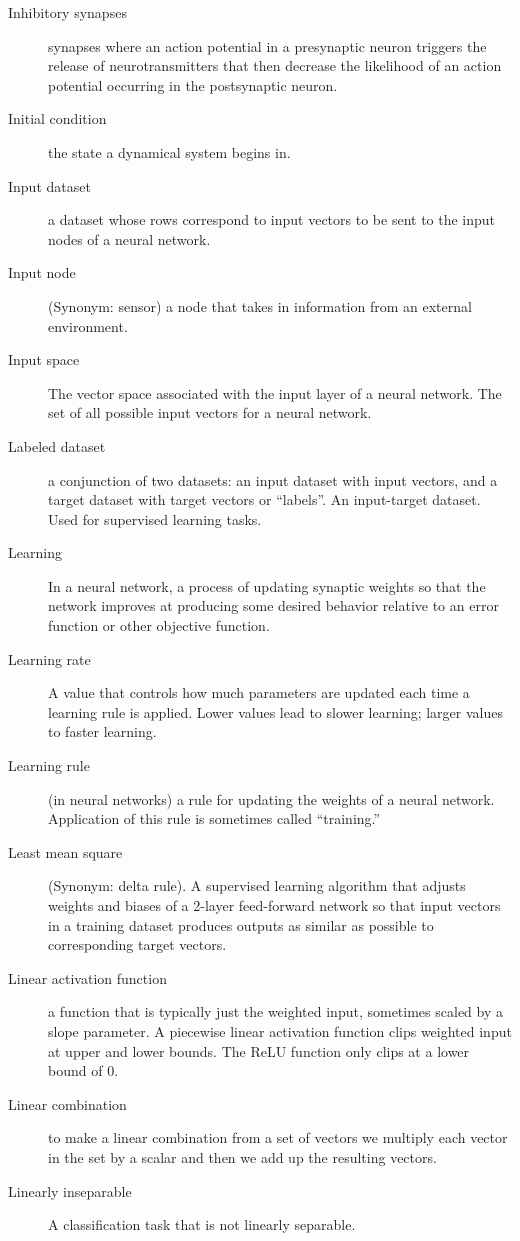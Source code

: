 \begin{description}
\item[Inhibitory synapses] synapses where an action potential in a presynaptic neuron triggers the release of neurotransmitters that then decrease the likelihood of an action potential occurring in the postsynaptic neuron.
\item[Initial condition] the state a dynamical system begins in.
\item[Input dataset] a dataset whose rows correspond to input vectors to be sent to the input nodes of a neural network.
\item[Input node] (Synonym: sensor) a node that takes in information from an external environment. 
\item[Input space] The vector space associated with the input layer of a neural network. The set of all possible input vectors for a neural network.
\item[Labeled dataset] a conjunction of two datasets: an input dataset with input vectors, and a target dataset with target vectors or ``labels''. An input-target dataset. Used for supervised learning tasks.  
\item[Learning] In a neural network, a process of updating synaptic weights so that the network improves at producing some desired behavior relative to an error function or other objective function.
\item[Learning rate] A value that controls how much parameters are updated each time a learning rule is applied. Lower values lead to slower learning; larger values to faster learning.
\item[Learning rule] (in neural networks) a rule for updating the weights of a neural network. Application of this rule is sometimes called ``training.''
\item[Least mean square] (Synonym: delta rule). A supervised learning algorithm that adjusts weights and biases of a 2-layer feed-forward network so that input vectors in a training dataset produces outputs as similar as possible to corresponding target vectors.
\item[Linear activation function] a function that is typically just the weighted input, sometimes scaled by a slope parameter. A piecewise linear activation function clips weighted input at  upper and lower bounds. The ReLU function only clips at a lower bound of 0.
\item[Linear combination] to make a linear combination from a set of vectors we multiply each vector in the set by a scalar and then we add up the resulting vectors.
\item[Linearly inseparable] A classification task that is not linearly separable.

\end{description}
